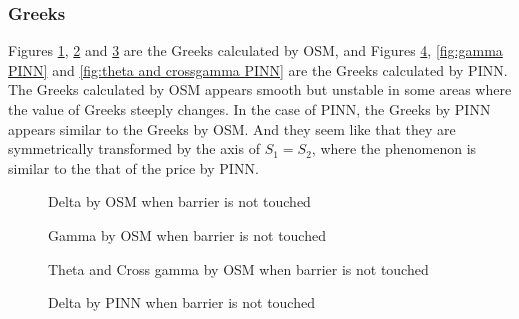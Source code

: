 \documentclass[11pt,reqno]{article}
\numberwithin{equation}{section}
\begin{document}
{\subsubsection{Greeks}

Figures \ref{fig:delta OSM}, \ref{fig:gamma OSM} and \ref{fig:theta and crossgamma OSM} are
 the Greeks calculated by OSM, and Figures \ref{fig:delta PINN}, \ref{fig:gamma PINN}
 and \ref{fig:theta and crossgamma PINN} are the Greeks calculated by PINN.
The Greeks calculated by OSM appears smooth but unstable in some areas where the value of Greeks steeply changes. In the case of PINN, the Greeks by PINN appears similar to the Greeks by OSM. And they seem like that they are symmetrically transformed by the axis of $S_1=S_2$, where the phenomenon is similar to the that of the price by PINN. 

\begin{figure}[H]
\centering
    \caption{Delta by OSM when barrier is not touched} 
    \label{fig:delta OSM}
\end{figure}

\begin{figure}[H]
\centering
    \caption{Gamma by OSM when barrier is not touched} 
    \label{fig:gamma OSM}
\end{figure}

\begin{figure}[H]
\centering
    \caption{Theta and Cross gamma by OSM when barrier is not touched}  
    \label{fig:theta and crossgamma OSM}
\end{figure}

\begin{figure}[H]
\centering
    \caption{Delta by PINN when barrier is not touched} 
    \label{fig:delta PINN}
\end{figure}

}
\end{document}
